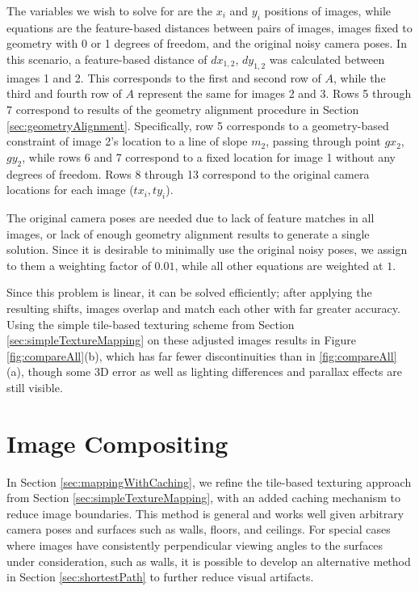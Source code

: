 \documentclass[]{spie}  %
\begin{document}
The variables we wish to solve for are the $x_i$ and $y_i$ positions
of images, while equations are the feature-based distances between
pairs of images, images fixed to geometry with 0 or 1 degrees of
freedom, and the original noisy camera poses. In this scenario, a
feature-based distance of $dx_{1,2}$, $dy_{1,2}$ was calculated
between images 1 and 2. This corresponds to the first and second row
of $A$, while the third and fourth row of $A$ represent the same for
images 2 and 3. Rows 5 through 7 correspond to results of the geometry
alignment procedure in Section
\ref{sec:geometryAlignment}. Specifically, row 5 corresponds to a
geometry-based constraint of image 2's location to a line of slope
$m_2$, passing through point $gx_2$, $gy_2$, while rows 6 and 7
correspond to a fixed location for image 1 without any degrees of
freedom. Rows 8 through 13 correspond to the original camera locations
for each image ($tx_i,ty_i$).

The original camera poses are needed due to lack of feature matches in
all images, or lack of enough geometry alignment results to generate a
single solution. Since it is desirable to minimally use the original
noisy poses, we assign to them a weighting factor of $0.01$, while all
other equations are weighted at $1$.


Since this problem is linear, it can be solved efficiently; after
applying the resulting shifts, images overlap and match each other
with far greater accuracy. Using the simple tile-based texturing
scheme from Section \ref{sec:simpleTextureMapping} on these adjusted
images results in Figure \ref{fig:compareAll}(b), which has far fewer
discontinuities than in \ref{fig:compareAll}(a), though some 3D error
as well as lighting differences and parallax effects are still
visible.

\section{Image Compositing}
\label{sec:imageCompositing}
In Section \ref{sec:mappingWithCaching}, we refine the tile-based
texturing approach from Section \ref{sec:simpleTextureMapping}, with
an added caching mechanism to reduce image boundaries. This method is
general and works well given arbitrary camera poses and surfaces such
as walls, floors, and ceilings. For special cases where images have
consistently perpendicular viewing angles to the surfaces under
consideration, such as walls, it is possible to develop an alternative
method in Section \ref{sec:shortestPath} to further reduce visual
artifacts.
\end{document}

